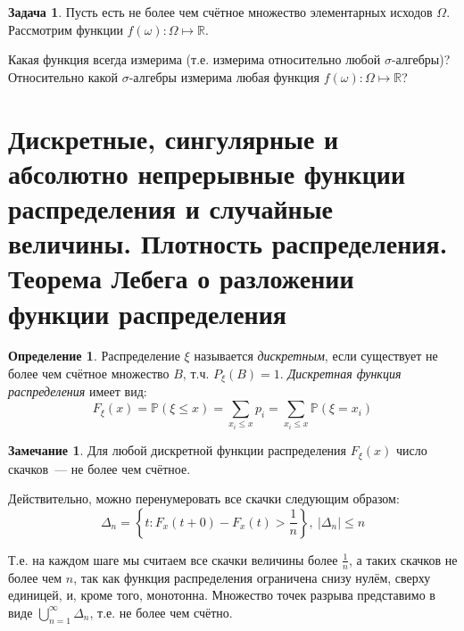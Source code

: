 \documentclass[oneside,final,14pt]{extreport}
\theoremstyle{plain}
\theoremstyle{definition}
\newtheorem*{defn}{Определение}
\newtheorem*{rmrk}{Замечание}
\newtheorem*{task}{Задача}
\theoremstyle{named}
\begin{document}
\begin{task}
Пусть есть не более чем счётное множество элементарных исходов $\Omega$. Рассмотрим функции ${f(\omega) \colon \Omega \mapsto \mathbb{R}}$.

Какая функция всегда измерима (т.е. измерима относительно любой ${\sigma \text{-алгебры}}$)? 
Относительно какой ${\sigma \text{-алгебры}}$ измерима любая функция ${f(\omega) \colon \Omega \mapsto \mathbb{R}}$?
\end{task}
 
\section{Дискретные, сингулярные и абсолютно непрерывные функции распределения и случайные величины. Плотность распределения. Теорема Лебега о разложении функции распределения}

\begin{defn}
    Распределение $\xi$ называется {\it дискретным}, если существует не более чем счётное множество $B$, т.ч. $P_\xi(B) = 1$. \textit{Дискретная функция распределения} имеет вид:
    \begin{equation*}
        F_\xi(x) = \mathbb{P}(\xi \leqslant x) = \sum\limits_{x_i \leqslant x}{}p_{i} = \sum\limits_{x_i \leqslant x}{}\mathbb{P}(\xi = x_{i})
    \end{equation*}
\end{defn}

\begin{rmrk}
    Для любой дискретной функции распределения $F_\xi(x)$ число скачков~--- не более чем счётное.
    
    Действительно, можно перенумеровать все скачки следующим образом:
    \begin{equation*}
        \Delta_{n}=\left\{t \colon F_{x}(t+0)-F_{x}(t)>\frac{1}{n}\right\},~ |\Delta_{n} | \leqslant n
    \end{equation*}
    
    Т.е. на каждом шаге мы считаем все скачки величины более $\frac{1}{n}$, а таких скачков не более чем $n$, так как функция распределения ограничена снизу нулём, сверху единицей, и, кроме того, монотонна.
    Множество точек разрыва представимо в виде $\bigcup\limits_{n = 1}^{\infty} \Delta_{n}$, т.е. не более чем счётно.
\end{rmrk}
\end{document}
